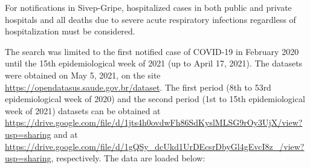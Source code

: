 \documentclass[
]{article}
\newenvironment{Shaded}{\begin{snugshade}}{\end{snugshade}}
\newcommand{\CommentTok}[1]{\textcolor[rgb]{0.56,0.35,0.01}{\textit{#1}}}
\newcommand{\DataTypeTok}[1]{\textcolor[rgb]{0.13,0.29,0.53}{#1}}
\newcommand{\DecValTok}[1]{\textcolor[rgb]{0.00,0.00,0.81}{#1}}
\newcommand{\KeywordTok}[1]{\textcolor[rgb]{0.13,0.29,0.53}{\textbf{#1}}}
\newcommand{\NormalTok}[1]{#1}
\newcommand{\OperatorTok}[1]{\textcolor[rgb]{0.81,0.36,0.00}{\textbf{#1}}}
\newcommand{\OtherTok}[1]{\textcolor[rgb]{0.56,0.35,0.01}{#1}}
\newcommand{\StringTok}[1]{\textcolor[rgb]{0.31,0.60,0.02}{#1}}
\begin{document}
For notifications in Sivep-Gripe, hospitalized cases in both public and
private hospitals and all deaths due to severe acute respiratory
infections regardless of hospitalization must be considered.

The search was limited to the first notified case of COVID-19 in
February 2020 until the 15th epidemiological week of 2021 (up to April
17, 2021). The datasets were obtained on May 5, 2021, on the site
\url{https://opendatasus.saude.gov.br/dataset}. The first period (8th to
53rd epidemiological week of 2020) and the second period (1st to 15th
epidemiological week of 2021) datasets can be obtained at
\url{https://drive.google.com/file/d/1jts4h0ovdwFh86SdKyslMLSG9rOy3UjX/view?usp=sharing}
and at
\url{https://drive.google.com/file/d/1gQSy_dcUkd1UrDEcsrDbyGl4gEvcI8z_/view?usp=sharing},
respectively. The data are loaded below:

\begin{Shaded}
\end{Shaded}
\end{document}
